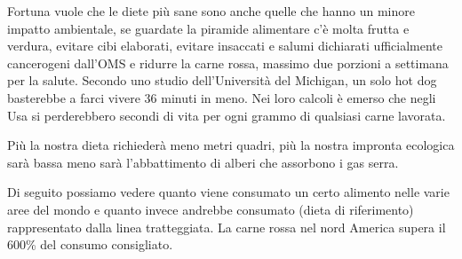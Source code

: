 \documentclass[12pt]{book} %
\begin{document}
\bigskip

Fortuna vuole che le diete più sane sono anche quelle che hanno un minore impatto ambientale, se guardate la piramide
alimentare c'è molta
frutta e verdura, evitare cibi elaborati, evitare insaccati e salumi dichiarati ufficialmente cancerogeni
dall'OMS e ridurre la carne rossa, massimo due porzioni a settimana per la salute. Secondo uno studio dell'Università del
Michigan, un solo hot dog basterebbe a farci vivere 36 minuti in meno. Nei loro calcoli è emerso che negli Usa si
perderebbero secondi di vita per ogni grammo di qualsiasi carne lavorata. 

Più la nostra dieta richiederà meno metri quadri, più la nostra impronta ecologica sarà bassa meno sarà l'abbattimento
di alberi che assorbono i gas
serra.


\bigskip

Di seguito possiamo vedere quanto viene consumato un certo alimento nelle varie aree del mondo e quanto invece andrebbe
consumato (dieta di riferimento) rappresentato dalla linea
tratteggiata. La carne rossa nel nord America supera il 600\% del consumo consigliato.

\bigskip
\end{document}
